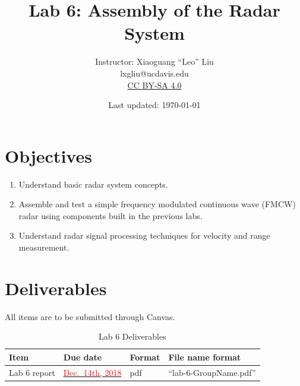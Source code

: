\documentclass[letterpaper, 11pt]{article}
\newcommand{\due}[1]{\href{https://github.com/ucdart/UCD-EEC134/blob/master/support/schedule/eec134-schedule.pdf}{\textcolor{red}{#1}}}
\begin{document}
\title{Lab 6: Assembly of the Radar System}
\author{Instructor: Xiaoguang ``Leo'' Liu\\lxgliu@ucdavis.edu \\
	\small \href{http://creativecommons.org/licenses/by-sa/4.0/}{CC BY-SA 4.0}}
\date{Last updated: \today}

\maketitle


\section{Objectives}

\begin{enumerate}[itemsep=0.1ex]
	\item Understand basic radar system concepts. 
	
	\item Assemble and test a simple frequency modulated continuous wave (FMCW) radar using components built in the previous labs. 
	
	\item Understand radar signal processing techniques for velocity and range measurement. 
\end{enumerate}

\section{Deliverables}
All items are to be submitted through Canvas.  

\vspace{0.5cm}

\begin{table}[h]
	\footnotesize
	\caption{Lab 6 Deliverables}
	\renewcommand{\arraystretch}{1.2}
	\begin{tabular}{|m{1in}|l|m{0.45in}|m{2in}|}
		\hline
		\textbf{Item} & \textbf{Due date} & \textbf{Format} & \textbf{File name format} \\
		\hline
		\hline
		Lab 6 report & \due{Dec.~14th, 2018} & pdf & ``lab-6-GroupName.pdf''\\
		\hline
	\end{tabular}
	\label{tab:deliverables}
\end{table}
\end{document}
